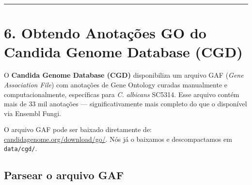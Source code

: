 \documentclass[
  letterpaper,
  DIV=11,
  numbers=noendperiod]{scrreprt}
\begin{document}
\begin{center}\rule{0.5\linewidth}{0.5pt}\end{center}

\section{6. Obtendo Anotações GO do Candida Genome Database
(CGD)}\label{obtendo-anotauxe7uxf5es-go-do-candida-genome-database-cgd}

O \textbf{Candida Genome Database (CGD)} disponibiliza um arquivo GAF
(\emph{Gene Association File}) com anotações de Gene Ontology curadas
manualmente e computacionalmente, específicas para \emph{C. albicans}
SC5314. Esse arquivo contém mais de 33 mil anotações ---
significativamente mais completo do que o disponível via Ensembl Fungi.

\begin{tcolorbox}[enhanced jigsaw, arc=.35mm, bottomrule=.15mm, bottomtitle=1mm, breakable, colback=white, colbacktitle=quarto-callout-note-color!10!white, colframe=quarto-callout-note-color-frame, coltitle=black, left=2mm, leftrule=.75mm, opacityback=0, opacitybacktitle=0.6, rightrule=.15mm, title=\textcolor{quarto-callout-note-color}{\faInfo}\hspace{0.5em}{Ponto Importante}, titlerule=0mm, toprule=.15mm, toptitle=1mm]

O arquivo GAF pode ser baixado diretamente de:
\href{http://www.candidagenome.org/download/go/}{candidagenome.org/download/go/}.
Nós já o baixamos e descompactamos em \texttt{data/cgd/}.

\end{tcolorbox}

\subsection{Parsear o arquivo GAF}\label{parsear-o-arquivo-gaf}
\end{document}
